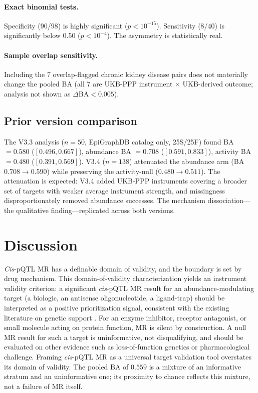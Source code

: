 \documentclass[11pt]{article}
\begin{document}
\paragraph{Exact binomial tests.}
Specificity (90/98) is highly significant ($p < 10^{-15}$). Sensitivity (8/40) is significantly below $0.50$ ($p < 10^{-4}$). The asymmetry is statistically real.

\paragraph{Sample overlap sensitivity.}
Including the 7 overlap-flagged chronic kidney disease pairs does not materially change the pooled BA (all 7 are UKB-PPP instrument $\times$ UKB-derived outcome; analysis not shown as $\Delta\text{BA} < 0.005$).

\subsection{Prior version comparison}
\label{sec:v33}

The V3.3 analysis ($n = 50$, EpiGraphDB catalog only, 25S/25F) found BA $= 0.580$ ($[0.496, 0.667]$), abundance BA $= 0.708$ ($[0.591, 0.833]$), activity BA $= 0.480$ ($[0.391, 0.569]$). V3.4 ($n = 138$) attenuated the abundance arm (BA $0.708 \rightarrow 0.590$) while preserving the activity-null ($0.480 \rightarrow 0.511$). The attenuation is expected: V3.4 added UKB-PPP instruments covering a broader set of targets with weaker average instrument strength, and missingness disproportionately removed abundance successes. The mechanism dissociation---the qualitative finding---replicated across both versions.

\section{Discussion}
\label{sec:discussion}

\emph{Cis}-pQTL MR has a definable domain of validity, and the boundary is set by drug mechanism. This domain-of-validity characterization yields an instrument validity criterion: a significant \emph{cis}-pQTL MR result for an abundance-modulating target (a biologic, an antisense oligonucleotide, a ligand-trap) should be interpreted as a positive prioritization signal, consistent with the existing literature on genetic support \cite{nelson2015support}. For an enzyme inhibitor, receptor antagonist, or small molecule acting on protein function, MR is silent by construction. A null MR result for such a target is uninformative, not disqualifying, and should be evaluated on other evidence such as loss-of-function genetics or pharmacological challenge. Framing \emph{cis}-pQTL MR as a universal target validation tool overstates its domain of validity. The pooled BA of $0.559$ is a mixture of an informative stratum and an uninformative one; its proximity to chance reflects this mixture, not a failure of MR itself.
\end{document}
